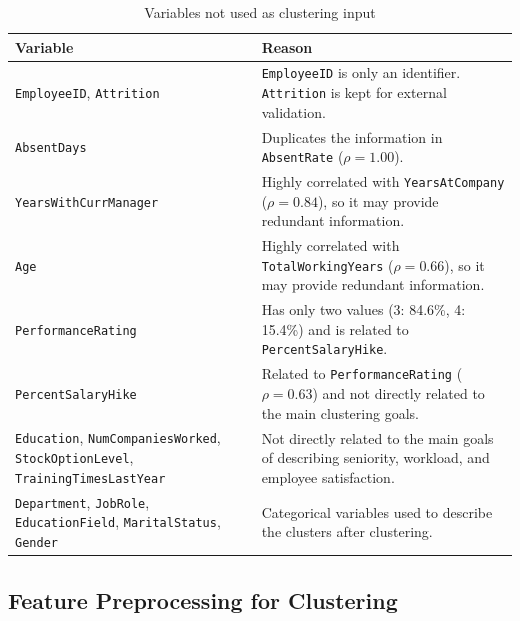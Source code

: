 \documentclass[12pt,a4paper]{article}
\begin{document}
\begin{table}[H]
\centering
\caption{Variables not used as clustering input}
\label{tab:excluded_features}
\small
\begin{tabularx}{\textwidth}{
  >{\raggedright\arraybackslash}p{4.2cm}
  >{\raggedright\arraybackslash}X}
\toprule
\textbf{Variable} & \textbf{Reason}\\
\midrule

\texttt{EmployeeID}, \texttt{Attrition}
& \texttt{EmployeeID} is only an identifier.
  \texttt{Attrition} is kept for external validation.\\

\texttt{AbsentDays}
& Duplicates the information in \texttt{AbsentRate}
  ($\rho = 1.00$).\\

\texttt{YearsWithCurrManager}
& Highly correlated with \texttt{YearsAtCompany}
  ($\rho = 0.84$), so it may provide redundant information.\\

\texttt{Age}
& Highly correlated with \texttt{TotalWorkingYears}
  ($\rho = 0.66$), so it may provide redundant information.\\

\texttt{PerformanceRating}
& Has only two values (3: 84.6\%, 4: 15.4\%)
  and is related to \texttt{PercentSalaryHike}.\\

\texttt{PercentSalaryHike}
& Related to \texttt{PerformanceRating}
  ($\rho = 0.63$) and not directly related to the
  main clustering goals.\\

\texttt{Education}, \texttt{NumCompaniesWorked},
\texttt{StockOptionLevel}, \texttt{TrainingTimesLastYear}
& Not directly related to the main goals of describing
  seniority, workload, and employee satisfaction.\\

\texttt{Department}, \texttt{JobRole},
\texttt{EducationField}, \texttt{MaritalStatus},
\texttt{Gender}
& Categorical variables used to describe the clusters
  after clustering.\\

\bottomrule
\end{tabularx}
\end{table}

\subsection{Feature Preprocessing for Clustering}
\label{sec:prep}
\end{document}
